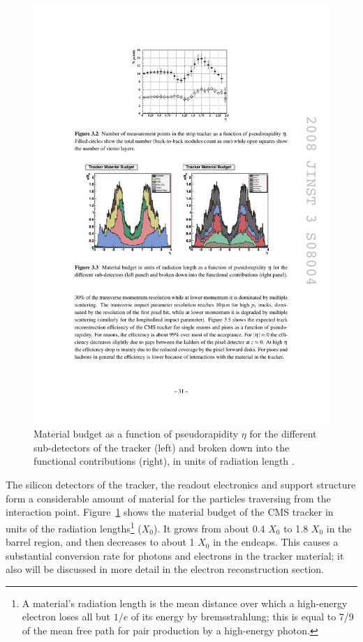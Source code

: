 \begin{figure}[!htbp]
  \begin{center}
    \leavevmode
    \includegraphics[width=\columnwidth]{tracker_material_budget}
    \caption{Material budget as a function of pseudorapidity $\eta$ for the different sub-detectors of the tracker
    (left) and broken down into the functional contributions (right), in units of radiation length \cite{CMS}.}
    \label{tracker_material_budget}
  \end{center}
\end{figure}

The silicon detectors of the tracker, the readout electronics and support structure form a considerable amount of
material for the particles traversing from the interaction point. Figure~\ref{tracker_material_budget} \cite{CMS} shows
the material budget of the CMS tracker in units of the radiation lengths\footnote{A material's radiation length is the
mean distance over which a high-energy electron loses all but $1/e$ of its energy by bremsstrahlung; this is equal to
\num{7/9} of the mean free path for pair production by a high-energy photon.} ($X_0$). It grows from about \num{0.4}
$X_0$ to \num{1.8} $X_0$ in the barrel region, and then decreases to about \num{1} $X_0$ in the endcaps. This causes a
substantial conversion rate for photons and electrons in the tracker material; it also will be discussed in more detail
in the electron reconstruction section.

